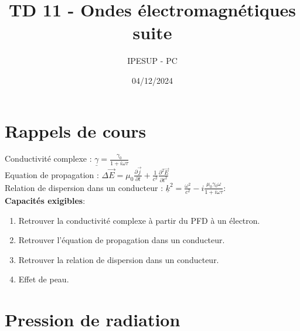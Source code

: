 \documentclass{article}
\title{TD 11 - Ondes électromagnétiques suite}
\author{IPESUP - PC }
\date{04/12/2024}
\begin{document}
\maketitle

\section{Rappels de cours}

Conductivité complexe : $\underline{\gamma} = \frac{\gamma_0}{1 + i \omega \tau}$\\

Equation de propagation : $\Delta {\vec{E}} = \mu_0 \frac{\partial \vec{j}}{\partial t } + \frac{1}{c^2} \frac{\partial^2 \vec{E}}{\partial t^2}$ \\

Relation de dispersion dans un conducteur : $\underline{k}^2 = \frac{\omega^2}{c^2} - i \frac{\mu_0 \gamma_0 \omega}{1 + i \omega \tau}$:\\[0.2cm]
\textbf{Capacités exigibles}: \\
\begin{enumerate}
  \item Retrouver la conductivité complexe à partir du PFD à un électron. 
  \item Retrouver l'équation de propagation dans un conducteur.
  \item Retrouver la relation de dispersion dans un conducteur. 
  \item Effet de peau. 
\end{enumerate}




\section{Pression de radiation}
\end{document}
